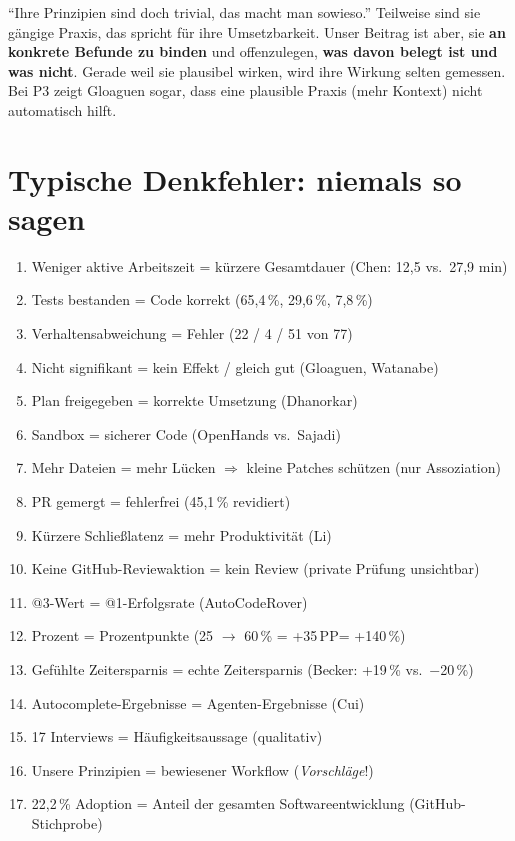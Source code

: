 \documentclass[12pt,a4paper]{article}
\newcommand{\pp}{\,PP}
\begin{document}
\begin{qa}{\enquote{Ihre Prinzipien sind doch trivial, das macht man sowieso.}}
Teilweise sind sie gängige Praxis, das spricht für ihre Umsetzbarkeit. Unser Beitrag ist aber, sie \textbf{an konkrete Befunde zu binden} und offenzulegen, \textbf{was davon belegt ist und was nicht}. Gerade weil sie plausibel wirken, wird ihre Wirkung selten gemessen. Bei P3 zeigt Gloaguen sogar, dass eine plausible Praxis (mehr Kontext) nicht automatisch hilft.
\end{qa}

\section{Typische Denkfehler: niemals so sagen}
\label{sec:fallen}

\begin{falle}
\begin{enumerate}
  \item Weniger aktive Arbeitszeit = kürzere Gesamtdauer \quad (Chen: 12,5 vs.\ 27,9 min)
  \item Tests bestanden = Code korrekt \quad (65,4\,\%, 29,6\,\%, 7,8\,\%)
  \item Verhaltensabweichung = Fehler \quad (22 / 4 / 51 von 77)
  \item Nicht signifikant = kein Effekt / gleich gut \quad (Gloaguen, Watanabe)
  \item Plan freigegeben = korrekte Umsetzung \quad (Dhanorkar)
  \item Sandbox = sicherer Code \quad (OpenHands vs.\ Sajadi)
  \item Mehr Dateien = mehr Lücken $\Rightarrow$ kleine Patches schützen \quad (nur Assoziation)
  \item PR gemergt = fehlerfrei \quad (45,1\,\% revidiert)
  \item Kürzere Schließlatenz = mehr Produktivität \quad (Li)
  \item Keine GitHub-Reviewaktion = kein Review \quad (private Prüfung unsichtbar)
  \item @3-Wert = @1-Erfolgsrate \quad (AutoCodeRover)
  \item Prozent = Prozentpunkte \quad (25 $\to$ 60\,\% = +35\pp = +140\,\%)
  \item Gefühlte Zeitersparnis = echte Zeitersparnis \quad (Becker: +19\,\% vs.\ $-$20\,\%)
  \item Autocomplete-Ergebnisse = Agenten-Ergebnisse \quad (Cui)
  \item 17 Interviews = Häufigkeitsaussage \quad (qualitativ)
  \item Unsere Prinzipien = bewiesener Workflow \quad (\emph{Vorschläge}!)
  \item 22,2\,\% Adoption = Anteil der gesamten Softwareentwicklung \quad (GitHub-Stichprobe)
\end{enumerate}
\end{falle}
\end{document}
